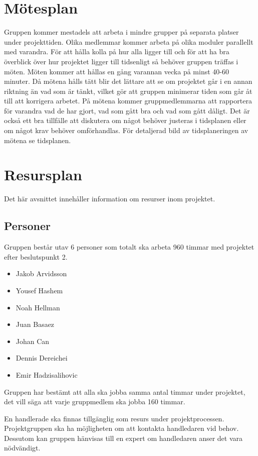 \documentclass[projektplan/plan.tex]{subfiles}
\begin{document}
\section{Mötesplan}
Gruppen kommer mestadels att arbeta i mindre grupper på separata platser under projekttiden. Olika medlemmar kommer arbeta på olika moduler parallellt med varandra. För att hålla kolla på hur alla ligger till och för att ha bra överblick över hur projektet ligger till tidsenligt så behöver gruppen träffas i möten. Möten kommer att hållas en gång varannan vecka på minst 40-60 minuter. Då mötena hålls tätt blir det lättare att se om projektet går i en annan riktning än vad som är tänkt, vilket gör att gruppen minimerar tiden som går åt till att korrigera arbetet. På mötena kommer gruppmedlemmarna att rapportera för varandra vad de har gjort, vad som gått bra och vad som gått dåligt. Det är också ett bra tillfälle att diskutera om något behöver justeras i tidsplanen eller om något krav behöver omförhandlas. För detaljerad bild av tidsplaneringen av mötena se tidsplanen.
\section{Resursplan}
Det här avsnittet innehåller information om resurser inom projektet.
\subsection{Personer}
Gruppen består utav 6 personer som totalt ska arbeta 960 timmar med projektet efter beslutspunkt 2.

\begin{itemize}
\item Jakob Arvidsson
\item Yousef Hashem
\item Noah Hellman
\item Juan Basaez
\item Johan Can
\item Dennis Dereichei
\item Emir Hadzisalihovic
\end{itemize}

Gruppen har bestämt att alla ska jobba samma antal timmar under projektet, det vill säga att varje gruppmedlem ska jobba 160 timmar.
\newline\newline

En handlerade ska finnas tillgänglig som resurs under projektprocessen.
Projektgruppen ska ha möjligheten om att kontakta handledaren vid behov.
Dessutom kan gruppen hänvisas till en expert om handledaren anser det vara  nödvändigt.
\end{document}
